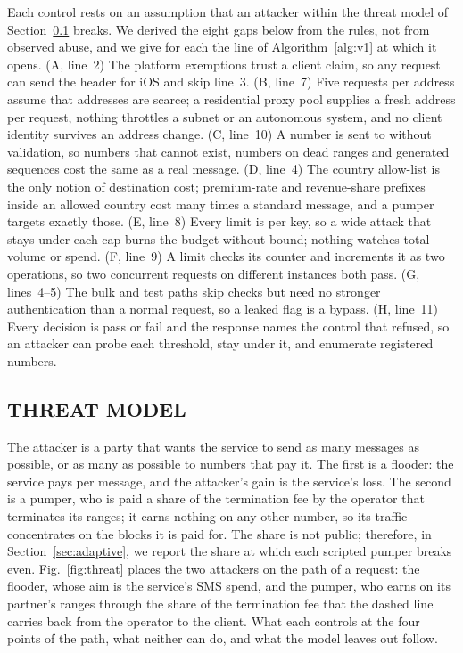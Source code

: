 \documentclass{IEEEoj}
\begin{document}
Each control rests on an assumption that an attacker within the threat model of Section~\ref{sec:threat} breaks. We derived the eight gaps below from the rules, not from observed abuse, and we give for each the line of Algorithm~\ref{alg:v1} at which it opens. (A, line~2) The platform exemptions trust a client claim, so any request can send the header for iOS and skip line~3. (B, line~7) Five requests per address assume that addresses are scarce; a residential proxy pool supplies a fresh address per request, nothing throttles a subnet or an autonomous system, and no client identity survives an address change. (C, line~10) A number is sent to without validation, so numbers that cannot exist, numbers on dead ranges and generated sequences cost the same as a real message. (D, line~4) The country allow-list is the only notion of destination cost; premium-rate and revenue-share prefixes inside an allowed country cost many times a standard message, and a pumper targets exactly those. (E, line~8) Every limit is per key, so a wide attack that stays under each cap burns the budget without bound; nothing watches total volume or spend. (F, line~9) A limit checks its counter and increments it as two operations, so two concurrent requests on different instances both pass. (G, lines~4--5) The bulk and test paths skip checks but need no stronger authentication than a normal request, so a leaked flag is a bypass. (H, line~11) Every decision is pass or fail and the response names the control that refused, so an attacker can probe each threshold, stay under it, and enumerate registered numbers.

\begin{algorithm}[!htb]
\caption{The v1 baseline.}
\label{alg:v1}
\footnotesize\raggedright

\end{algorithm}

\subsection{THREAT MODEL}
\label{sec:threat}
The attacker is a party that wants the service to send as many messages as possible, or as many as possible to numbers that pay it. The first is a flooder: the service pays per message, and the attacker's gain is the service's loss. The second is a pumper, who is paid a share of the termination fee by the operator that terminates its ranges; it earns nothing on any other number, so its traffic concentrates on the blocks it is paid for. The share is not public; therefore, in Section~\ref{sec:adaptive}, we report the share at which each scripted pumper breaks even. Fig.~\ref{fig:threat} places the two attackers on the path of a request: the flooder, whose aim is the service's SMS spend, and the pumper, who earns on its partner's ranges through the share of the termination fee that the dashed line carries back from the operator to the client. What each controls at the four points of the path, what neither can do, and what the model leaves out follow.
\end{document}
